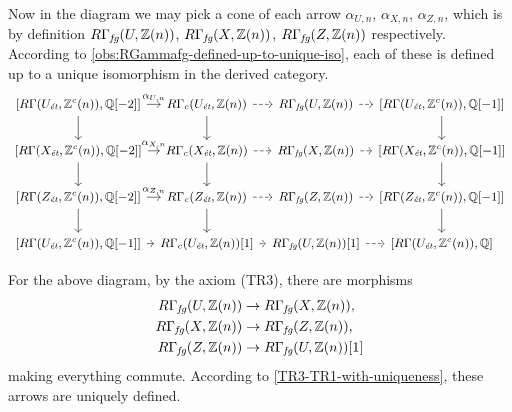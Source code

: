 Now in the diagram  we may
pick a cone of each arrow $\alpha_{U,n}$, $\alpha_{X,n}$, $\alpha_{Z,n}$, which
is by definition $R\Gamma_\text{\it fg} (U, \mathbb{Z} (n))$,
$R\Gamma_\text{\it fg} (X, \mathbb{Z} (n))$, $R\Gamma_\text{\it fg} (Z, \mathbb{Z} (n))$
respectively. According to \ref{obs:RGammafg-defined-up-to-unique-iso}, each of
these is defined up to a unique isomorphism in the derived category.
\[ \begin{tikzcd}[column sep=0.5em, font=\small]
    {[R\Gamma (U_\text{\it ét}, \ZZ^c (n)), \QQ [-2]]} \ar{d}\ar{r}{\alpha_{U,n}} & R\Gamma_c (U_\text{\it ét}, \ZZ (n)) \ar{d}\ar[dashed]{r} & R\Gamma_\text{\it fg} (U, \ZZ(n))\ar[dashed]{r} & {[R\Gamma (U_\text{\it ét}, \ZZ^c (n)), \QQ [-1]]} \ar{d} \\
    {[R\Gamma (X_\text{\it ét}, \ZZ^c (n)), \QQ [-2]]} \ar{d}\ar{r}{\alpha_{X,n}} & R\Gamma_c (X_\text{\it ét}, \ZZ (n)) \ar{d}\ar[dashed]{r} & R\Gamma_\text{\it fg} (X, \ZZ(n))\ar[dashed]{r} & {[R\Gamma (X_\text{\it ét}, \ZZ^c (n)), \QQ [-1]]} \ar{d} \\
    {[R\Gamma (Z_\text{\it ét}, \ZZ^c (n)), \QQ [-2]]} \ar{d}\ar{r}{\alpha_{Z,n}} & R\Gamma_c (Z_\text{\it ét}, \ZZ (n)) \ar{d}\ar[dashed]{r} & R\Gamma_\text{\it fg} (Z, \ZZ(n))\ar[dashed]{r} & {[R\Gamma (Z_\text{\it ét}, \ZZ^c (n)), \QQ [-1]]} \ar{d} \\
    {[R\Gamma (U_\text{\it ét}, \ZZ^c (n)), \QQ [-1]]}\ar{r} & R\Gamma_c (U_\text{\it ét}, \ZZ (n)) [1]\ar[dashed]{r} & R\Gamma_\text{\it fg} (U, \ZZ(n)) [1]\ar[dashed]{r} & {[R\Gamma (U_\text{\it ét}, \ZZ^c (n)), \QQ]}
  \end{tikzcd} \]

For the above diagram, by the axiom (TR3), there are morphisms
\begin{align*}
  R\Gamma_\text{\it fg} (U, \mathbb{Z}(n)) & \to R\Gamma_\text{\it fg} (X, \mathbb{Z}(n)),\\
  R\Gamma_\text{\it fg} (X, \mathbb{Z}(n)) & \to R\Gamma_\text{\it fg} (Z, \mathbb{Z}(n)),\\
  R\Gamma_\text{\it fg} (Z, \mathbb{Z}(n)) & \to R\Gamma_\text{\it fg} (U, \mathbb{Z}(n)) [1]
\end{align*}
making everything commute. According to \ref{TR3-TR1-with-uniqueness}, these
arrows are uniquely defined.

